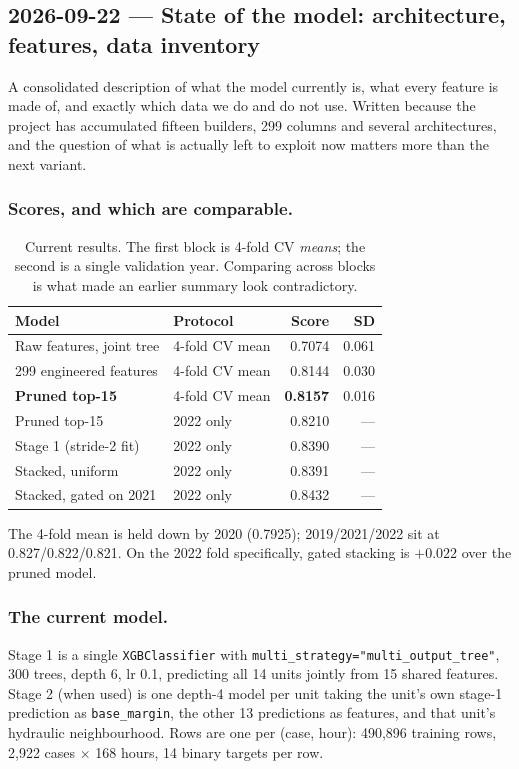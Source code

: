 \subsection{2026-09-22 --- State of the model: architecture, features, data inventory}
\label{sec:state}

A consolidated description of what the model currently is, what every feature is made of, and
exactly which data we do and do not use. Written because the project has accumulated fifteen
builders, 299 columns and several architectures, and the question of what is actually left to
exploit now matters more than the next variant.

\subsubsection*{Scores, and which are comparable.}

\begin{table}[htbp]
  \centering
  \caption{Current results. The first block is 4-fold CV \emph{means}; the second is a single
  validation year. Comparing across blocks is what made an earlier summary look contradictory.}
  \begin{tabular}{llrr}
    \toprule
    Model & Protocol & Score & SD \\
    \midrule
    Raw features, joint tree   & 4-fold CV mean & 0.7074 & 0.061 \\
    299 engineered features    & 4-fold CV mean & 0.8144 & 0.030 \\
    \textbf{Pruned top-15}     & 4-fold CV mean & \textbf{0.8157} & 0.016 \\
    \midrule
    Pruned top-15              & 2022 only & 0.8210 & --- \\
    Stage 1 (stride-2 fit)     & 2022 only & 0.8390 & --- \\
    Stacked, uniform           & 2022 only & 0.8391 & --- \\
    Stacked, gated on 2021     & 2022 only & 0.8432 & --- \\
    \bottomrule
  \end{tabular}
\end{table}

The 4-fold mean is held down by 2020 (0.7925); 2019/2021/2022 sit at 0.827/0.822/0.821. On the
2022 fold specifically, gated stacking is $+0.022$ over the pruned model.

\subsubsection*{The current model.}
Stage 1 is a single \texttt{XGBClassifier} with \texttt{multi\_strategy="multi\_output\_tree"},
300 trees, depth 6, lr 0.1, predicting all 14 units jointly from 15 shared features. Stage 2 (when
used) is one depth-4 model per unit taking the unit's own stage-1 prediction as
\texttt{base\_margin}, the other 13 predictions as features, and that unit's hydraulic
neighbourhood. Rows are one per (case, hour): 490{,}896 training rows, 2{,}922 cases $\times$ 168
hours, 14 binary targets per row.

